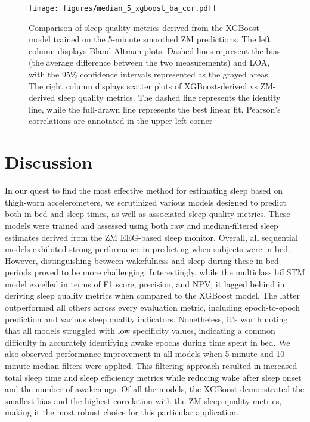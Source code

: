 \documentclass[
  10pt,
]{scrbook}
\begin{document}
\begin{figure}

{\centering \texttt{[image: figures/median\_5\_xgboost\_ba\_cor.pdf]}

}

\caption{\label{fig-xgb_ba_cor}Comparison of sleep quality metrics
derived from the XGBoost model trained on the 5-minute smoothed ZM
predictions. The left column displays Bland-Altman plots. Dashed lines
represent the bias (the average difference between the two measurements)
and LOA, with the 95\% confidence intervals represented as the grayed
areas. The right column displays scatter plots of XGBoost-derived vs
ZM-derived sleep quality metrics. The dashed line represents the
identity line, while the full-drawn line represents the best linear fit.
Pearson's correlations are annotated in the upper left corner}

\end{figure}

\hypertarget{discussion-2}{%
\section{Discussion}\label{discussion-2}}

In our quest to find the most effective method for estimating sleep
based on thigh-worn accelerometers, we scrutinized various models
designed to predict both in-bed and sleep times, as well as associated
sleep quality metrics. These models were trained and assessed using both
raw and median-filtered sleep estimates derived from the ZM EEG-based
sleep monitor. Overall, all sequential models exhibited strong
performance in predicting when subjects were in bed. However,
distinguishing between wakefulness and sleep during these in-bed periods
proved to be more challenging. Interestingly, while the multiclass
biLSTM model excelled in terms of F1 score, precision, and NPV, it
lagged behind in deriving sleep quality metrics when compared to the
XGBoost model. The latter outperformed all others across every
evaluation metric, including epoch-to-epoch prediction and various sleep
quality indicators. Nonetheless, it's worth noting that all models
struggled with low specificity values, indicating a common difficulty in
accurately identifying awake epochs during time spent in bed. We also
observed performance improvement in all models when 5-minute and
10-minute median filters were applied. This filtering approach resulted
in increased total sleep time and sleep efficiency metrics while
reducing wake after sleep onset and the number of awakenings. Of all the
models, the XGBoost demonstrated the smallest bias and the highest
correlation with the ZM sleep quality metrics, making it the most robust
choice for this particular application.
\end{document}
